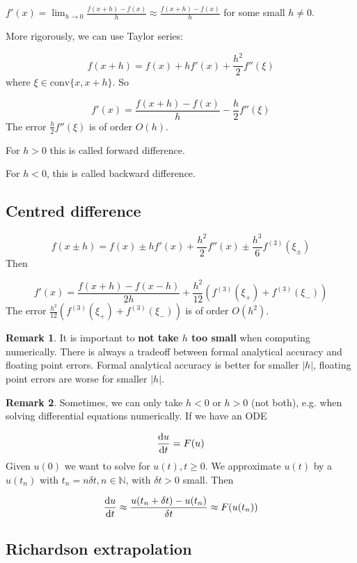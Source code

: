 \documentclass[12pt,a4paper]{article}
\theoremstyle{definition}
\newtheorem*{remark}{Remark}
\begin{document}
$f'(x) = \lim_{h \rightarrow 0} \frac{f(x + h) - f(x)}{h} \approx \frac{f(x + h) - f(x)}{h}$ for some small $h \ne 0$.

More rigorously, we can use Taylor series:

\[ f(x + h) = f(x) + h f'(x) + \frac{h^2}{2} f''(\xi) \]
where $\xi \in \text{conv} \{x, x + h \}$. So

\[ f'(x) = \frac{f(x + h) - f(x)}{h} - \frac{h}{2} f''(\xi) \]
The error $\frac{h}{2} f''(\xi)$ is of order $O(h)$.

For $h > 0$ this is called forward difference.

For $h < 0$, this is called backward difference.

\subsection{Centred difference}

\[ f(x \pm h) = f(x) \pm h f'(x) + \frac{h^2}{2} f''(x) \pm \frac{h^3}{6} f^{(3)}(\xi_{\pm}) \]
Then

\[ f'(x) = \frac{f(x + h) - f(x - h)}{2h} + \frac{h^2}{12} \left( f^{(3)}(\xi_+) + f^{(3)}(\xi_-) \right) \]
The error $\frac{h^2}{12} \left( f^{(3)}(\xi_+) + f^{(3)}(\xi_-) \right)$ is of order $O(h^2)$.

\begin{remark}
	It is important to \textbf{not take $h$ too small} when computing numerically. There is always a tradeoff between formal analytical accuracy and floating point errors. Formal analytical accuracy is better for smaller $|h|$, floating point errors are worse for smaller $|h|$.
\end{remark}

\begin{remark}
	Sometimes, we can only take $h < 0$ or $h > 0$ (not both), e.g. when solving differential equations numerically. If we have an ODE

	\[ \diff{u}{t} = F(u) \]
	Given $u(0)$ we want to solve for $u(t), t \ge 0$. We approximate $u(t)$ by a $u(t_n)$ with $t_n = n \delta t, n \in \mathbb{N}$, with $\delta t > 0$ small. Then

	\[ \diff{u}{t} \approx \frac{u(t_n + \delta t) - u(t_n)}{\delta t} \approx F(u(t_n)) \]
\end{remark}

\subsection{Richardson extrapolation}
\end{document}
